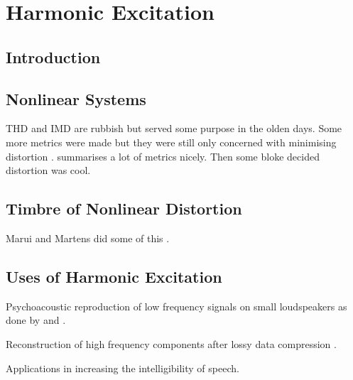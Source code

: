 
\chapter{Harmonic Excitation}
\label{chap:Excitation}

\section{Introduction}
\label{sec:Excitation-Introduction}

\section{Nonlinear Systems}
\label{sec:Excitation-NonlinearSystems}
	\note
	{
		THD and IMD are rubbish but served some purpose in the olden days. Some more metrics were made but they were still only concerned with minimising distortion \citep{lee2003auditory, geddes2003auditory, tan2004predicting}. \citet{voishvillo2006assessment} summarises a lot of metrics nicely. Then some bloke decided distortion was cool.
	}

\section{Timbre of Nonlinear Distortion}
\label{sec:Excitation-Timbre}
	\note
	{
		Marui and Martens did some of this \citep{marui2005timbre, marui2005constructing, marui2005predicting}.
	}

\section{Uses of Harmonic Excitation}
\label{sec:Excitation-Uses}
	\note
	{
		Psychoacoustic reproduction of low frequency signals on small loudspeakers as done by \citet{larsen2002reproducing} and \citet{gan2001virtual}.

		Reconstruction of high frequency components after lossy data compression \citep{friedrich2007spectral, nagel2009a, nagel2010a, valin2000bandwidth, dietz2002spectral, larsen2002efficient, sha2010high}.

		Applications in increasing the intelligibility of speech.
	}

